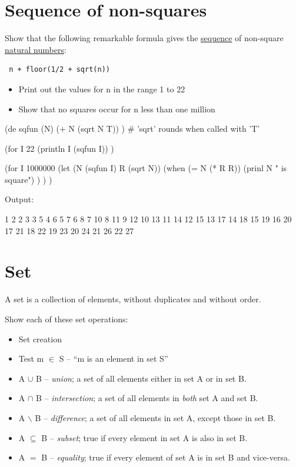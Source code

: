 \pagebreak{}
\section*{Sequence of non-squares}

Show that the following remarkable formula gives the
\href{http://www.research.att.com/~njas/sequences/A000037}{sequence} of
non-square \href{http://en.wikipedia.org/wiki/Natural\_number}{natural
numbers}:

\begin{verbatim}
 n + floor(1/2 + sqrt(n))
\end{verbatim}

\begin{itemize}
\item
  Print out the values for n in the range 1 to 22
\item
  Show that no squares occur for n less than one million
\end{itemize}


\begin{wideverbatim}

(de sqfun (N)
   (+ N (sqrt N T)) )  # 'sqrt' rounds when called with 'T'

(for I 22
   (println I (sqfun I)) )

(for I 1000000
   (let (N (sqfun I)  R (sqrt N))
      (when (= N (* R R))
         (prinl N " is square") ) ) )

Output:

1 2
2 3
3 5
4 6
5 7
6 8
7 10
8 11
9 12
10 13
11 14
12 15
13 17
14 18
15 19
16 20
17 21
18 22
19 23
20 24
21 26
22 27

\end{wideverbatim}

\pagebreak{}
\section*{Set}

A set is a collection of elements, without duplicates and without order.

Show each of these set operations:

\begin{itemize}
\item
  Set creation
\item
  Test m $\in$ S -- ``m is an element in set S''
\item
  A $\cup$ B -- \emph{union}; a set of all elements either in set A or in set
  B.
\item
  A $\cap$ B -- \emph{intersection}; a set of all elements in \emph{both} set
  A and set B.
\item
  A $\backslash$ B -- \emph{difference}; a set of all elements in set A, except
  those in set B.
\item
  A $\subseteq$ B -- \emph{subset}; true if every element in set A is also in set
  B.
\item
  A $=$ B -- \emph{equality}; true if every element of set A is in set B
  and vice-versa.
\end{itemize}

